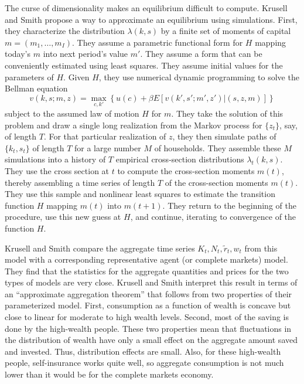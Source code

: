 %
%
%
%
The curse of dimensionality makes an equilibrium difficult to compute.
Krusell and Smith propose a way to approximate an equilibrium using
simulations. First, they characterize the distribution $\lambda(k,s)$
by a finite set of moments of capital $m = (m_1, \ldots, m_I)$.  They
assume a parametric functional form for $H$ mapping today's $m$ into
next period's value $m'$.  They assume a form that can be conveniently
estimated using least squares.  They assume initial values for the parameters
of $H$.  Given $H$, they use numerical dynamic programming to solve the
Bellman equation
  $$ v(k,s;m,z) = \max_{c, k'}\left\{
 u(c) + \beta  E [v(k', s';m',z') \vert (s,z,m)] \right\}$$
subject to the assumed  law of motion $H$ for $m$.   They take the solution
of this problem and draw a single long realization from the Markov process
for $\{z_t\}$, say, of length $T$.  For that particular realization of $z$, they
then simulate paths of $\{k_t,s_t\}$ of length $T$ for a large number $M$
of households.  They assemble these $M$ simulations into
a history  of $T$ empirical cross-section distributions $\lambda_t(k,s)$.
They use the cross section at $t$ to compute the cross-section
moments $m(t)$, thereby assembling a time series of length $T$ of the
cross-section moments $m(t)$.  They use this sample and nonlinear least squares
to estimate the transition function $H$ mapping $m(t)$ into $m(t+1)$.
 They return to the beginning of the procedure, use this new guess at
$H$, and continue, iterating to convergence of the function $H$.

   Krusell and Smith
compare the  aggregate time series $K_t, N_t,\tilde r_t, w_t$
from this model with a corresponding representative agent
(or complete markets) model.  They find that the statistics
for the  aggregate quantities and prices for the two types of models
are very close.   Krusell and Smith interpret this result in terms
of an ``approximate aggregation theorem'' that follows from two properties
of their parameterized model.  First, consumption as a function of wealth
 is concave but close to linear for moderate to high wealth levels.
Second, most of the saving is done by the high-wealth people.  These two
properties mean that fluctuations in the distribution of wealth have only
a small effect on the aggregate amount saved and invested.  Thus, distribution
effects are small.  Also, for these high-wealth people, self-insurance
works quite well, so aggregate consumption is not much lower than it would
be for the complete markets economy.

